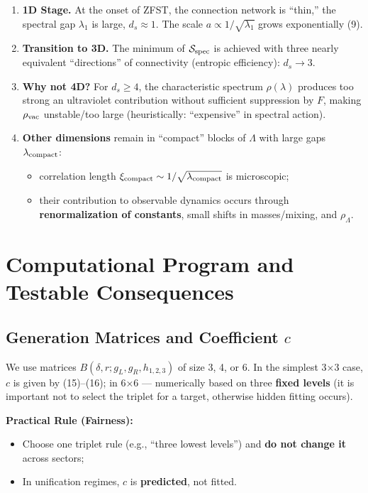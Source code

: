 \documentclass[12pt,a4paper]{article}
\begin{document}
\begin{enumerate}
    \item \textbf{1D Stage.} At the onset of ZFST, the connection network is ``thin,'' the spectral gap \(\lambda_1\) is large, \(d_s \approx 1\). The scale \(a \propto 1/\sqrt{\lambda_1}\) grows exponentially (9).
    \item \textbf{Transition to 3D.} The minimum of \(\mathcal{S}_{\rm spec}\) is achieved with three nearly equivalent ``directions'' of connectivity (entropic efficiency): \(d_s \to 3\).
    \item \textbf{Why not 4D?} For \(d_s \ge 4\), the characteristic spectrum \(\rho(\lambda)\) produces too strong an ultraviolet contribution without sufficient suppression by \(F\), making \(\rho_{\rm vac}\) unstable/too large (heuristically: ``expensive'' in spectral action).
    \item \textbf{Other dimensions} remain in ``compact'' blocks of \(\Lambda\) with large gaps \(\lambda_{\rm compact}\):
    \begin{itemize}
        \item correlation length \(\xi_{\rm compact} \sim 1/\sqrt{\lambda_{\rm compact}}\) is microscopic;
        \item their contribution to observable dynamics occurs through \textbf{renormalization of constants}, small shifts in masses/mixing, and \(\rho_\Lambda\).
    \end{itemize}
\end{enumerate}

\section{Computational Program and Testable Consequences}

\subsection{Generation Matrices and Coefficient \(c\)}
We use matrices \(B(\delta, r; g_L, g_R, h_{1,2,3})\) of size 3, 4, or 6. In the simplest 3×3 case, \(c\) is given by (15)–(16); in 6×6 — numerically based on three \textbf{fixed levels} (it is important not to select the triplet for a target, otherwise hidden fitting occurs).

\textbf{Practical Rule (Fairness):}
\begin{itemize}
    \item Choose one triplet rule (e.g., ``three lowest levels'') and \textbf{do not change it} across sectors;
    \item In unification regimes, \(c\) is \textbf{predicted}, not fitted.
\end{itemize}
\end{document}
